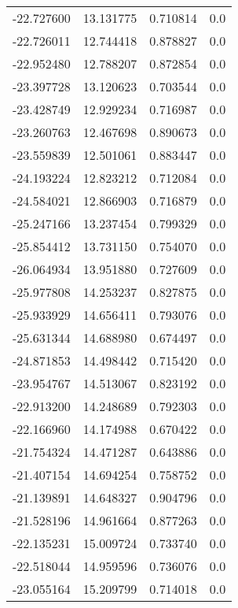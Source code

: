 \begin{tabular}{rrrr}
      -22.727600 &        13.131775 &    0.710814 &   0.0 \\
      -22.726011 &        12.744418 &    0.878827 &   0.0 \\
      -22.952480 &        12.788207 &    0.872854 &   0.0 \\
      -23.397728 &        13.120623 &    0.703544 &   0.0 \\
      -23.428749 &        12.929234 &    0.716987 &   0.0 \\
      -23.260763 &        12.467698 &    0.890673 &   0.0 \\
      -23.559839 &        12.501061 &    0.883447 &   0.0 \\
      -24.193224 &        12.823212 &    0.712084 &   0.0 \\
      -24.584021 &        12.866903 &    0.716879 &   0.0 \\
      -25.247166 &        13.237454 &    0.799329 &   0.0 \\
      -25.854412 &        13.731150 &    0.754070 &   0.0 \\
      -26.064934 &        13.951880 &    0.727609 &   0.0 \\
      -25.977808 &        14.253237 &    0.827875 &   0.0 \\
      -25.933929 &        14.656411 &    0.793076 &   0.0 \\
      -25.631344 &        14.688980 &    0.674497 &   0.0 \\
      -24.871853 &        14.498442 &    0.715420 &   0.0 \\
      -23.954767 &        14.513067 &    0.823192 &   0.0 \\
      -22.913200 &        14.248689 &    0.792303 &   0.0 \\
      -22.166960 &        14.174988 &    0.670422 &   0.0 \\
      -21.754324 &        14.471287 &    0.643886 &   0.0 \\
      -21.407154 &        14.694254 &    0.758752 &   0.0 \\
      -21.139891 &        14.648327 &    0.904796 &   0.0 \\
      -21.528196 &        14.961664 &    0.877263 &   0.0 \\
      -22.135231 &        15.009724 &    0.733740 &   0.0 \\
      -22.518044 &        14.959596 &    0.736076 &   0.0 \\
      -23.055164 &        15.209799 &    0.714018 &   0.0 \\

\end{tabular}
